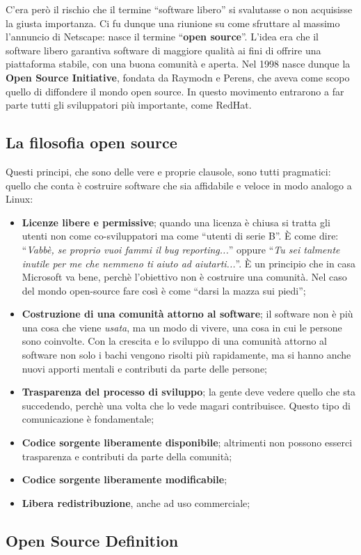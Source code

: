 C'era però il rischio che il termine ``software libero'' si svalutasse o non acquisisse la giusta importanza. Ci fu dunque una riunione su come sfruttare al massimo l'annuncio di Netscape: nasce il termine ``\textbf{open source}''. L'idea era che il software libero garantiva software di maggiore qualità ai fini di offrire una piattaforma stabile, con una buona comunità e aperta. Nel 1998 nasce dunque la \textbf{Open Source Initiative}, fondata da Raymodn e Perens, che aveva come scopo quello di diffondere il mondo open source. In questo movimento entrarono a far parte tutti gli sviluppatori più importante, come RedHat. 

\subsection{La filosofia open source}

Questi principi, che sono delle vere e proprie clausole, sono tutti pragmatici: quello che conta è costruire software che sia affidabile e veloce in modo analogo a Linux:

\begin{itemize}

\item \textbf{Licenze libere e permissive}; quando una licenza è chiusa si tratta gli utenti non come co-sviluppatori ma come ``utenti di serie B''. È come dire: ``\textit{Vabbè, se proprio vuoi fammi il bug reporting...}'' oppure ``\textit{Tu sei talmente inutile per me che nemmeno ti aiuto ad aiutarti...}''. È un principio che in casa Microsoft va bene, perchè l'obiettivo non è costruire una comunità. Nel caso del mondo open-source fare così è come ``darsi la mazza sui piedi'';
\item \textbf{Costruzione di una comunità attorno al software}; il software non è più una cosa che viene \textit{usata}, ma un modo di vivere, una cosa in cui le persone sono coinvolte. Con la crescita e lo sviluppo di una comunità attorno al software non solo i bachi vengono risolti più rapidamente, ma si hanno anche nuovi apporti mentali e contributi da parte delle persone;
\item \textbf{Trasparenza del processo di sviluppo}; la gente deve vedere quello che sta succedendo, perchè una volta che lo vede magari contribuisce. Questo tipo di comunicazione è fondamentale;
\item \textbf{Codice sorgente liberamente disponibile}; altrimenti non possono esserci trasparenza e contributi da parte della comunità;
\item \textbf{Codice sorgente liberamente modificabile};
\item \textbf{Libera redistribuzione}, anche ad uso commerciale;

\end{itemize}

\subsection{Open Source Definition}

